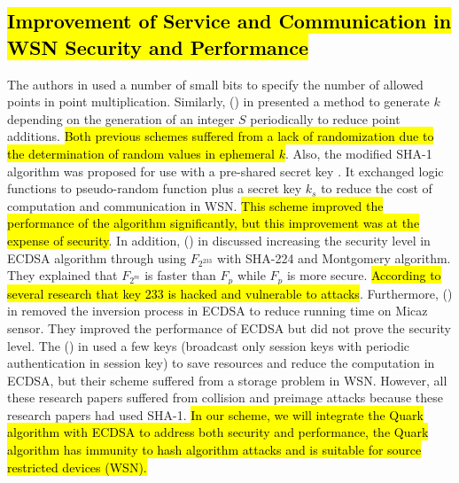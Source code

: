 \documentclass[a4paper,11pt]{article}
\DeclareRobustCommand{\hlyellow}[1]{{\sethlcolor{white}\hl{#1}}}
\begin{document}
\subsection{\hlyellow{Improvement of Service and Communication in WSN Security and Performance}}
The authors in \cite{p40} used a number of small bits to specify the number of allowed points in point multiplication. Similarly, \citeauthor{p25}(\citeyear{p25}) in \cite{p25} presented a method to generate $k$ depending on the generation of an integer $S$ periodically to reduce point additions. \hlyellow{Both previous schemes suffered from a lack of randomization due to the determination of random values in ephemeral $k$}. Also, the modified SHA-1 algorithm was proposed for use with a pre-shared secret key  \cite{p34}. It exchanged logic functions to pseudo-random function plus a secret key $k_s$ to reduce the cost of computation and communication in WSN. \hlyellow{This scheme improved the performance of the algorithm significantly, but this improvement was at the expense of security}. In addition, \citeauthor{p26}(\citeyear{p26}) in \cite{p26} discussed increasing the security level in ECDSA algorithm through using $F_{2^{233}}$ with SHA-224 and Montgomery algorithm. They explained that $F_{2^m}$ is faster than $F_p$ while $F_p$ is more secure. \hlyellow{According to several research that key 233 is hacked and vulnerable to attacks}. Furthermore, \citeauthor{p12}(\citeyear{p12}) in \cite{p12} removed the inversion process in ECDSA to reduce running time on Micaz sensor. They improved the performance of ECDSA but did not prove the security level. The \citeauthor{p8}(\citeyear{p8}) in \cite{p8} used a few keys (broadcast only session keys with periodic authentication in session key) to save resources and reduce the computation in ECDSA, but their scheme suffered from a storage problem in WSN. However, all these research papers suffered from collision and preimage attacks because these research papers had used SHA-1. \hlyellow{In our scheme, we will integrate the Quark algorithm with ECDSA to address both security and performance, the Quark algorithm has immunity to hash algorithm attacks and is suitable for source restricted devices (WSN).}\\
\end{document}
